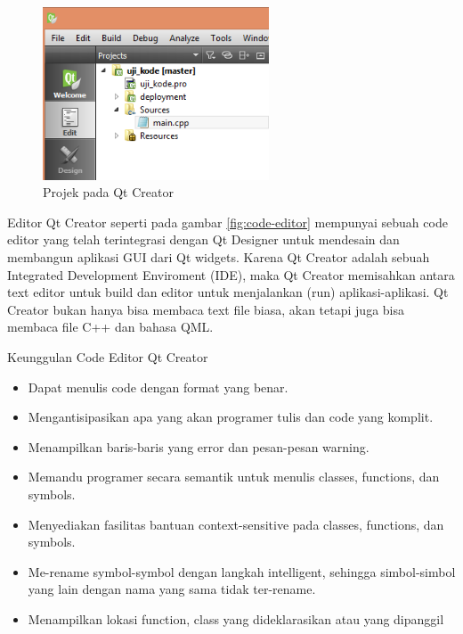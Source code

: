 \begin{figure}[htbp]
\centering 
\includegraphics[width=0.6\textwidth]{../manuscript/images/Capture1-1.PNG}
\caption{Projek pada Qt Creator}
\label{fig:projek-pada-qt-creator}
\end{figure}

Editor Qt Creator seperti pada gambar \ref{fig:code-editor}
 mempunyai sebuah code editor yang telah terintegrasi
dengan Qt Designer untuk mendesain dan membangun aplikasi GUI dari 
Qt widgets. Karena Qt Creator adalah sebuah 
Integrated Development Enviroment (IDE), maka Qt Creator memisahkan 
antara text editor untuk build dan editor untuk menjalankan (run) 
aplikasi-aplikasi. Qt Creator bukan hanya bisa membaca text file biasa, 
akan tetapi juga bisa membaca file C++ dan bahasa QML.

Keunggulan Code Editor Qt Creator

\begin{itemize}

\item
  Dapat menulis code dengan format yang benar.
\item
  Mengantisipasikan apa yang akan programer tulis dan code yang komplit.
\item
  Menampilkan baris-baris yang error dan pesan-pesan warning.
\item
  Memandu programer secara semantik untuk menulis classes, functions,
  dan symbols.
\item
  Menyediakan fasilitas bantuan context-sensitive pada classes,
  functions, dan symbols.
\item
  Me-rename symbol-symbol dengan langkah intelligent, sehingga
  simbol-simbol yang lain dengan nama yang sama tidak ter-rename.
\item
  Menampilkan lokasi function, class yang dideklarasikan atau yang
  dipanggil
\end{itemize}

